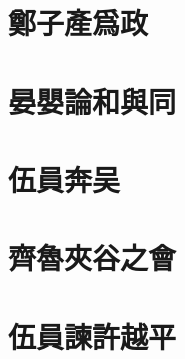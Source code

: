 \documentclass{article}
\begin{document}
\section{鄭子產爲政}

\section{晏嬰論和與同}

\section{伍員奔吴}

\section{齊魯夾谷之會}

\section{伍員諫許越平}
\end{document}
